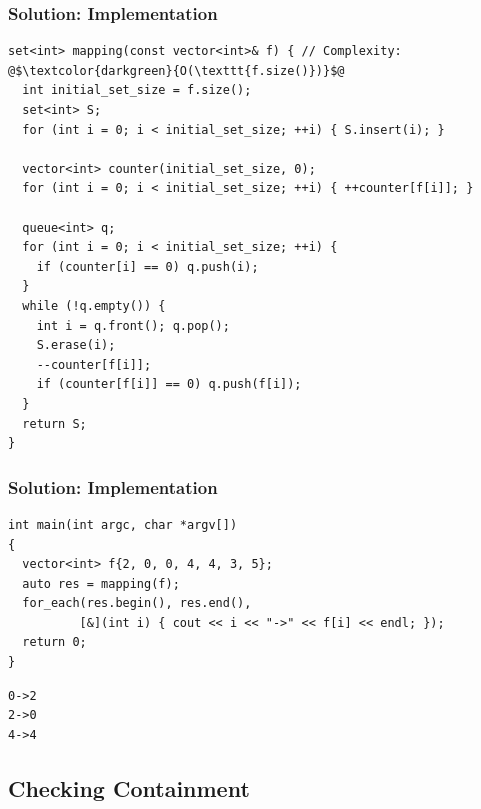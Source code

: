 \documentclass{beamer}
\begin{document}
\begin{frame}[containsverbatim]
\frametitle{Solution: Implementation}

\scriptsize
\begin{lstlisting}
set<int> mapping(const vector<int>& f) { // Complexity: @$\textcolor{darkgreen}{O(\texttt{f.size()})}$@
  int initial_set_size = f.size();
  set<int> S;
  for (int i = 0; i < initial_set_size; ++i) { S.insert(i); }

  vector<int> counter(initial_set_size, 0);
  for (int i = 0; i < initial_set_size; ++i) { ++counter[f[i]]; }

  queue<int> q;
  for (int i = 0; i < initial_set_size; ++i) {
    if (counter[i] == 0) q.push(i);
  }
  while (!q.empty()) {
    int i = q.front(); q.pop();
    S.erase(i);
    --counter[f[i]];
    if (counter[f[i]] == 0) q.push(f[i]);
  }
  return S;
}
\end{lstlisting}

\end{frame}

\begin{frame}[containsverbatim]
\frametitle{Solution: Implementation}

\scriptsize
\begin{lstlisting}
int main(int argc, char *argv[])
{
  vector<int> f{2, 0, 0, 4, 4, 3, 5};
  auto res = mapping(f);
  for_each(res.begin(), res.end(),
          [&](int i) { cout << i << "->" << f[i] << endl; });
  return 0;
}
\end{lstlisting}

\begin{verbatim}
0->2
2->0
4->4
\end{verbatim}

\end{frame}

\subsection{Checking Containment}

\end{document}
